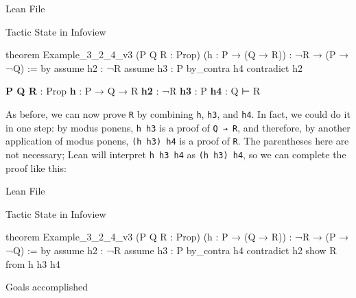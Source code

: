 \documentclass[
  letterpaper,
  DIV=11,
  numbers=noendperiod]{scrreprt}
\newenvironment{Shaded}{\begin{snugshade}}{\end{snugshade}}
\newcommand{\InformationTok}[1]{\textcolor[rgb]{0.37,0.37,0.37}{#1}}
\newcommand{\KeywordTok}[1]{\textcolor[rgb]{0.00,0.23,0.31}{#1}}
\newcommand{\NormalTok}[1]{\textcolor[rgb]{0.00,0.23,0.31}{#1}}
\newcommand{\SpecialCharTok}[1]{\textcolor[rgb]{0.37,0.37,0.37}{#1}}
\renewcommand{\KeywordTok}[1]{\textcolor[HTML]{0000FF}{#1}}
\renewcommand{\SpecialCharTok}[1]{}
\renewcommand{\InformationTok}[1]{\textcolor[HTML]{D2691E}{\textbf{#1}}}
\begin{document}
Lean File

Tactic State in Infoview

\begin{Shaded}
\begin{Highlighting}[]
\KeywordTok{theorem}\NormalTok{ Example\_3\_2\_4\_v3 (P Q R : }\KeywordTok{Prop}\NormalTok{)}
\NormalTok{(h : P → (Q → R)) : ¬R → (P → ¬Q) := }\KeywordTok{by}
  \KeywordTok{assume}\NormalTok{ h2 : ¬R}
  \KeywordTok{assume}\NormalTok{ h3 : P}
  \KeywordTok{by\_contra}\NormalTok{ h4}
  \KeywordTok{contradict}\NormalTok{ h2}
\end{Highlighting}
\end{Shaded}

\begin{Shaded}
\begin{Highlighting}[]
\InformationTok{P Q R }\NormalTok{: Prop}
\InformationTok{h }\NormalTok{: P → Q → R}
\InformationTok{h2 }\NormalTok{: ¬R}
\InformationTok{h3 }\NormalTok{: P}
\InformationTok{h4 }\NormalTok{: Q}
\NormalTok{⊢ R}
\end{Highlighting}
\end{Shaded}

As before, we can now prove \texttt{R} by combining \texttt{h},
\texttt{h3}, and \texttt{h4}. In fact, we could do it in one step: by
modus ponens, \texttt{h\ h3} is a proof of \texttt{Q\ →\ R}, and
therefore, by another application of modus ponens, \texttt{(h\ h3)\ h4}
is a proof of \texttt{R}. The parentheses here are not necessary; Lean
will interpret \texttt{h\ h3\ h4} as \texttt{(h\ h3)\ h4}, so we can
complete the proof like this:

Lean File

Tactic State in Infoview

\begin{Shaded}
\begin{Highlighting}[]
\KeywordTok{theorem}\NormalTok{ Example\_3\_2\_4\_v3 (P Q R : }\KeywordTok{Prop}\NormalTok{)}
\NormalTok{(h : P → (Q → R)) : ¬R → (P → ¬Q) := }\KeywordTok{by}
  \KeywordTok{assume}\NormalTok{ h2 : ¬R}
  \KeywordTok{assume}\NormalTok{ h3 : P}
  \KeywordTok{by\_contra}\NormalTok{ h4}
  \KeywordTok{contradict}\NormalTok{ h2}
  \KeywordTok{show}\NormalTok{ R }\KeywordTok{from}\NormalTok{ h h3 h4}
\end{Highlighting}
\end{Shaded}

\begin{Shaded}
\begin{Highlighting}[]
\SpecialCharTok{{-}}\NormalTok{Goals accomplished 🎉}
\end{Highlighting}
\end{Shaded}
\end{document}
